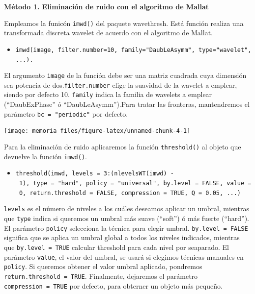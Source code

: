 \documentclass[
]{article}
\providecommand{\tightlist}{%
  \setlength{\itemsep}{0pt}\setlength{\parskip}{0pt}}
\begin{document}
\textbf{Método 1. Eliminación de ruido con el algoritmo de Mallat}

Empleamos la funicón \texttt{imwd()} del paquete wavethresh. Está
función realiza una transformada discreta wavelet de acuerdo con el
algoritmo de Mallat.

\begin{itemize}
\tightlist
\item
  \texttt{imwd(image,\ filter.number=10,\ family="DaubLeAsymm",\ type="wavelet",...).}
\end{itemize}

El argumento \texttt{image} de la función debe ser una matriz cuadrada
cuya dimensión sea potencia de dos.\texttt{filter.number} elige la
suavidad de la wavelet a emplear, siendo por defecto 10. \texttt{family}
indica la familia de wavelets a emplear (``DaubExPhase'' ó
``DaubLeAsymm'').Para tratar las fronteras, mantendremos el parámetro
\texttt{bc\ =\ "periodic"} por defecto.

\begin{center}\texttt{[image: memoria\_files/figure-latex/unnamed-chunk-4-1]} \end{center}

Para la eliminación de ruido aplicaremos la función \texttt{threshold()}
al objeto que devuelve la función \texttt{imwd()}.

\begin{itemize}
\tightlist
\item
  \texttt{threshold(imwd,\ levels\ =\ 3:(nlevelsWT(imwd)\ -\ 1),\ type\ =\ "hard",\ policy\ =\ "universal",\ by.level\ =\ FALSE,\ value\ =\ 0,\ return.threshold\ =\ FALSE,\ compression\ =\ TRUE,\ Q\ =\ 0.05,\ ...)}
\end{itemize}

\texttt{levels} es el número de niveles a los cuáles deseamos aplicar un
umbral, mientras que \texttt{type} indica si queremos un umbral más
suave (``soft'') ó más fuerte (``hard''). El parámetro \texttt{policy}
selecciona la técnica para elegir umbral. \texttt{by.level\ =\ FALSE}
significa que se aplica un umbral global a todos los niveles indicados,
mientras que \texttt{by.level\ =\ TRUE} calcular threshold para cada
nivel por seaparado. El parámetro \texttt{value}, el valor del umbral,
se usará si elegimos técnicas manuales en \texttt{policy}. Si queremos
obtener el valor umbral aplicado, pondremos
\texttt{return.threshold\ =\ TRUE}. Finalmente, dejaremos el parámetro
\texttt{compression\ =\ TRUE} por defecto, para obterner un objeto más
pequeño.
\end{document}
